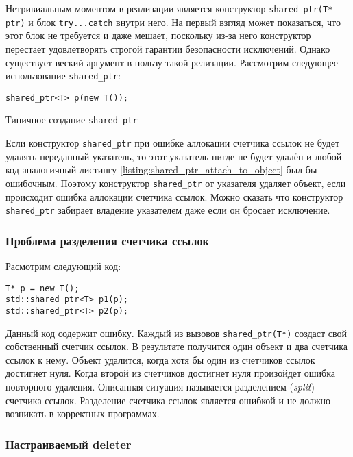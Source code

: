 Нетривиальным моментом в реализации является конструктор \texttt{shared_ptr(T* ptr)} и блок \texttt{try...catch} внутри него. На первый взгляд может показаться, что этот блок не требуется и даже мешает, поскольку из-за него конструктор перестает удовлетворять строгой гарантии безопасности исключений. Однако существует веский аргумент в пользу такой релизации. Рассмотрим следующее использование \texttt{shared_ptr}:

\begin{listing}
\begin{verbatim}
shared_ptr<T> p(new T());
\end{verbatim}
\caption{Типичное создание \texttt{shared_ptr}}
\label{listing:shared_ptr_attach_to_object}
\end{listing}

Если конструктор \texttt{shared_ptr} при ошибке аллокации счетчика ссылок не будет удалять переданный указатель, то этот указатель нигде не будет удалён и любой код аналогичный листингу \ref{listing:shared_ptr_attach_to_object} был бы ошибочным. Поэтому конструктор \texttt{shared_ptr} от указателя удаляет объект, если происходит ошибка аллокации счетчика ссылок. Можно сказать что конструктор \texttt{shared_ptr} забирает владение указателем даже если он бросает исключение.

\subsubsection{Проблема разделения счетчика ссылок}
\label{reference_counter_split_problem}

Расмотрим следующий код:
\begin{verbatim}
T* p = new T();
std::shared_ptr<T> p1(p);
std::shared_ptr<T> p2(p);
\end{verbatim}
Данный код содержит ошибку. Каждый из вызовов \texttt{shared_ptr(T*)} создаст свой собственный счетчик ссылок. В результате получится один объект и два счетчика ссылок к нему. Объект удалится, когда хотя бы один из счетчиков ссылок достигнет нуля. Когда второй из счетчиков достигнет нуля произойдет ошибка повторного удаления. Описанная ситуация называется разделением ({\it split}) счетчика ссылок. Разделение счетчика ссылок является ошибкой и не должно возникать в корректных программах.

\subsubsection{Настраиваемый deleter}

